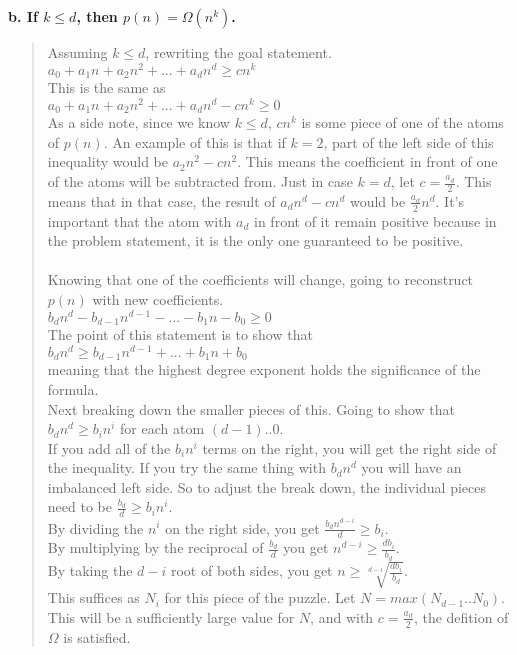 \documentclass{article}
\begin{document}
\textbf{b. If $k \leq d$, then $p(n) = \Omega(n^{k})$.\\}
\begin{quote}
\textsf{Assuming $k \leq d$, rewriting the goal statement.\\
$a_{0} + a_{1}n + a_{2}n^{2} + ... + a_{d}n^{d} \geq cn^{k}$\\
This is the same as\\
$a_{0} + a_{1}n + a_{2}n^{2} + ... + a_{d}n^{d} - cn^{k} \geq 0$\\
As a side note, since we know $k \leq d$, $cn^{k}$ is some piece of one of the atoms of $p(n)$.
An example of this is that if $k = 2$, part of the left side of this inequality would be $a_{2}n^{2} - cn^{2}$.
This means the coefficient in front of one of the atoms will be subtracted from. Just in case $k = d$, let
$c = \frac{a_{d}}{2}$. This means that in that case, the result of $a_{d}n^{d} - cn^{d}$ would be
$\frac{a_{d}}{2}n^{d}$. It's important that the atom with $a_{d}$ in front of it remain positive because in
the problem statement, it is the only one guaranteed to be positive.\\
\\
Knowing that one of the coefficients will change, going to reconstruct $p(n)$ with new coefficients.\\
$b_{d}n^{d} - b_{d-1}n^{d-1} - ... - b_{1}n - b_{0} \geq 0$\\
The point of this statement is to show that\\
$b_{d}n^{d} \geq b_{d-1}n^{d-1} + ... + b_{1}n + b_{0}$\\
meaning that the highest degree exponent holds the significance of the formula.\\
Next breaking down the smaller pieces of this. Going to show that $b_{d}n^{d} \geq b_{i}n^{i}$ for each atom
$(d-1)..0$.\\
If you add all of the $b_{i}n^{i}$ terms on the right, you will get the right side of the inequality. If you
try the same thing with $b_{d}n^{d}$ you will have an imbalanced left side. So to adjust the break down, the
individual pieces need to be $\frac{b_{d}}{d} \geq b_{i}n^{i}$.\\
By dividing the $n^{i}$ on the right side, you get $\frac{b_{d}n^{d-i}}{d} \geq b_{i}$.\\
By multiplying by the reciprocal of $\frac{b_{d}}{d}$ you get $n^{d-i} \geq \frac{db_{i}}{b_{d}}$.\\
By taking the $d-i$ root of both sides, you get $n \geq \sqrt[d-i]{\frac{db_{i}}{b_{d}}}$.\\
This suffices as $N_{i}$ for this piece of the puzzle. Let $N = max(N_{d-1}..N_{0})$. This will be a sufficiently
large value for $N$, and with $c = \frac{a_{d}}{2}$, the defition of $\Omega$ is satisfied.\\}
\end{quote}
\end{document}
